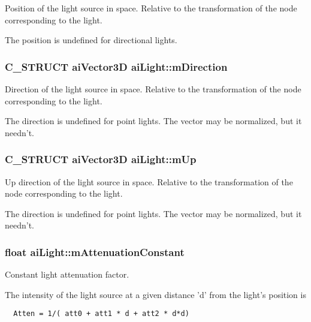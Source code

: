 Position of the light source in space. Relative to the transformation of the node corresponding to the light.

The position is undefined for directional lights. \hypertarget{structai_light_f3776d5e4e6065cb6dd7e10dc656dada}{
\subsubsection[mDirection]{\setlength{\rightskip}{0pt plus 5cm}C\_\-STRUCT aiVector3D {\bf aiLight::mDirection}}}
\label{structai_light_f3776d5e4e6065cb6dd7e10dc656dada}


Direction of the light source in space. Relative to the transformation of the node corresponding to the light.

The direction is undefined for point lights. The vector may be normalized, but it needn't. \hypertarget{structai_light_c6d03040085bf88979bc55e19ff3a7d6}{
\subsubsection[mUp]{\setlength{\rightskip}{0pt plus 5cm}C\_\-STRUCT aiVector3D {\bf aiLight::mUp}}}
\label{structai_light_c6d03040085bf88979bc55e19ff3a7d6}


Up direction of the light source in space. Relative to the transformation of the node corresponding to the light.

The direction is undefined for point lights. The vector may be normalized, but it needn't. \hypertarget{structai_light_e8804b3c309527ca0f85d676bab55710}{
\subsubsection[mAttenuationConstant]{\setlength{\rightskip}{0pt plus 5cm}float {\bf aiLight::mAttenuationConstant}}}
\label{structai_light_e8804b3c309527ca0f85d676bab55710}


Constant light attenuation factor.

The intensity of the light source at a given distance 'd' from the light's position is 

\begin{Code}\begin{verbatim}  Atten = 1/( att0 + att1 * d + att2 * d*d)
\end{verbatim}
\end{Code}


